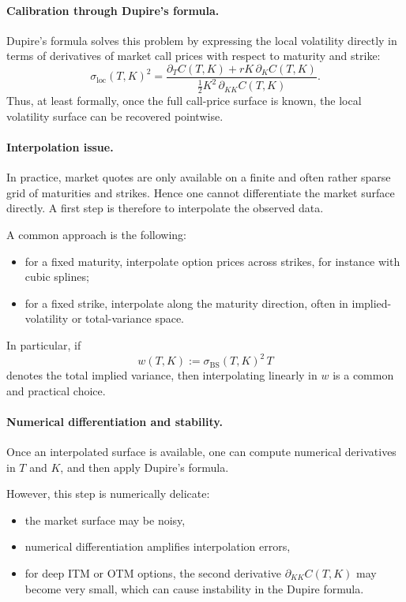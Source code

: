 \documentclass[11pt]{article}
\theoremstyle{plain}
\theoremstyle{definition}
\theoremstyle{remark}
\begin{document}
\paragraph{Calibration through Dupire's formula.}
Dupire's formula solves this problem by expressing the local volatility
directly in terms of derivatives of market call prices with respect to
maturity and strike:
\[
\sigma_{\mathrm{loc}}(T,K)^2
=
\frac{
\partial_T C(T,K)+rK\,\partial_K C(T,K)
}{
\frac12 K^2\,\partial_{KK}C(T,K)
}.
\]
Thus, at least formally, once the full call-price surface is known, the
local volatility surface can be recovered pointwise.

\paragraph{Interpolation issue.}
In practice, market quotes are only available on a finite and often
rather sparse grid of maturities and strikes.
Hence one cannot differentiate the market surface directly.
A first step is therefore to interpolate the observed data.

A common approach is the following:
\begin{itemize}[leftmargin=1.4em]
    \item for a fixed maturity, interpolate option prices across strikes,
    for instance with cubic splines;
    \item for a fixed strike, interpolate along the maturity direction,
    often in implied-volatility or total-variance space.  
\end{itemize}

In particular, if
\[
w(T,K):=\sigma_{\mathrm{BS}}(T,K)^2\,T
\]
denotes the total implied variance, then interpolating linearly in
\(w\) is a common and practical choice. 

\paragraph{Numerical differentiation and stability.}
Once an interpolated surface is available, one can compute numerical
derivatives in \(T\) and \(K\), and then apply Dupire's formula.

However, this step is numerically delicate:
\begin{itemize}[leftmargin=1.4em]
    \item the market surface may be noisy,
    \item numerical differentiation amplifies interpolation errors,
    \item for deep ITM or OTM options, the second derivative
    \(\partial_{KK}C(T,K)\) may become very small, which can cause
    instability in the Dupire formula. 
\end{itemize}
\end{document}

